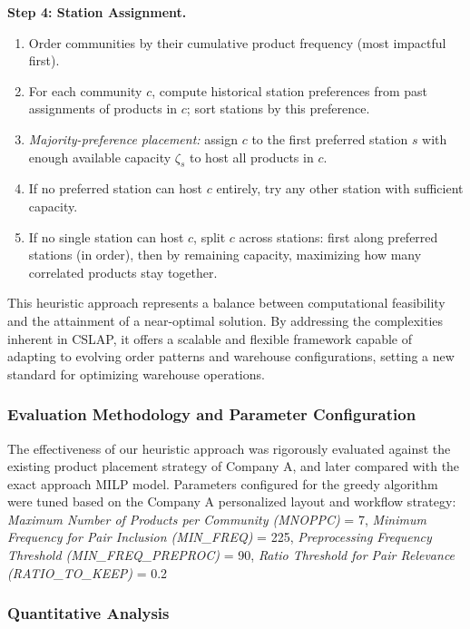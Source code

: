 \documentclass[11pt]{elsarticle}
\begin{document}
\begin{algorithm}[H]
\begin{algorithmic}[1]
\medskip
\textbf{Step 4: Station Assignment.}
\begin{enumerate}[label=(\alph*)]
\item Order communities by their cumulative product frequency (most impactful first).
\item For each community $c$, compute historical station preferences from past assignments of products in $c$; sort stations by this preference.
\item \emph{Majority-preference placement:} assign $c$ to the first preferred station $s$ with enough available capacity $\zeta_s$ to host all products in $c$.
\item If no preferred station can host $c$ entirely, try any other station with sufficient capacity.
\item If no single station can host $c$, split $c$ across stations: first along preferred stations (in order), then by remaining capacity, maximizing how many correlated products stay together.
\end{enumerate}
\end{algorithmic}
\end{algorithm}

This heuristic approach represents a balance between computational feasibility and the attainment of a near-optimal solution. By addressing the complexities inherent in CSLAP, it offers a scalable and flexible framework capable of adapting to evolving order patterns and warehouse configurations, setting a new standard for optimizing warehouse operations.

\subsubsection{\textbf{Evaluation Methodology and Parameter Configuration}}
The effectiveness of our heuristic approach was rigorously evaluated against the existing product placement strategy of Company A, and later compared with the exact approach MILP model. Parameters configured for the greedy algorithm were tuned based on the Company A personalized layout and workflow strategy: \textit{Maximum Number of Products per Community (MNOPPC)} = 7, \textit{Minimum Frequency for Pair Inclusion (MIN\_FREQ)} = 225, \textit{Preprocessing Frequency Threshold (MIN\_FREQ\_PREPROC)} = 90, \textit{Ratio Threshold for Pair Relevance (RATIO\_TO\_KEEP)} = 0.2

\subsubsection{\textbf{Quantitative Analysis}}
\end{document}
